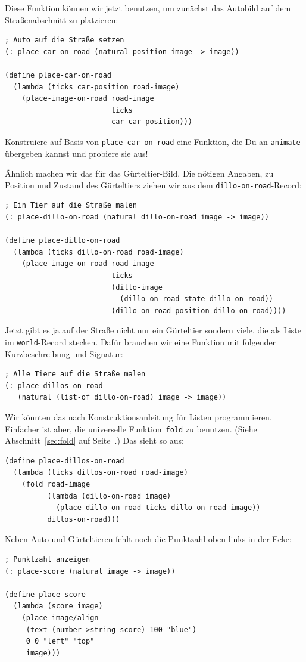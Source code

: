 Diese Funktion können wir jetzt benutzen, um zunächst das Autobild auf
dem Straßenabschnitt zu platzieren:
% 
\begin{lstlisting}
; Auto auf die Straße setzen
(: place-car-on-road (natural position image -> image))
                      
(define place-car-on-road
  (lambda (ticks car-position road-image)
    (place-image-on-road road-image
                         ticks
                         car car-position)))
\end{lstlisting}
%
\begin{aufgabeinline}
  Konstruiere auf Basis von \lstinline{place-car-on-road} eine
  Funktion, die Du an \lstinline{animate} übergeben kannst und
  probiere sie aus!
\end{aufgabeinline}
%
Ähnlich machen wir das für das Gürteltier-Bild.  Die nötigen Angaben,
zu Position und Zustand des Gürteltiers ziehen wir aus dem
\lstinline{dillo-on-road}-Record:
%
\begin{lstlisting}
; Ein Tier auf die Straße malen
(: place-dillo-on-road (natural dillo-on-road image -> image))

(define place-dillo-on-road
  (lambda (ticks dillo-on-road road-image)
    (place-image-on-road road-image
                         ticks
                         (dillo-image
                           (dillo-on-road-state dillo-on-road))
                         (dillo-on-road-position dillo-on-road))))
\end{lstlisting}
%
Jetzt gibt es ja auf der Straße nicht nur ein Gürteltier sondern
viele, die als Liste im \lstinline{world}-Record stecken.  Dafür
brauchen wir eine Funktion mit folgender Kurzbeschreibung und
Signatur:
%
\begin{lstlisting}
; Alle Tiere auf die Straße malen
(: place-dillos-on-road
   (natural (list-of dillo-on-road) image -> image))
\end{lstlisting}
%
Wir könnten das nach Konstruktionsanleitung für Listen programmieren.
Einfacher ist aber, die universelle Funktion~\lstinline{fold} zu
benutzen. (Siehe Abschnitt~\ref{sec:fold} auf
Seite~\pageref{sec:fold}.)  Das sieht so aus:
%
\begin{lstlisting}
(define place-dillos-on-road
  (lambda (ticks dillos-on-road road-image)
    (fold road-image
          (lambda (dillo-on-road image)
            (place-dillo-on-road ticks dillo-on-road image))
          dillos-on-road)))
\end{lstlisting}
%
Neben Auto und Gürteltieren fehlt noch die Punktzahl oben links in der
Ecke:
%
\begin{lstlisting}
; Punktzahl anzeigen
(: place-score (natural image -> image))

(define place-score
  (lambda (score image)
    (place-image/align
     (text (number->string score) 100 "blue")
     0 0 "left" "top"
     image)))
\end{lstlisting}
%

